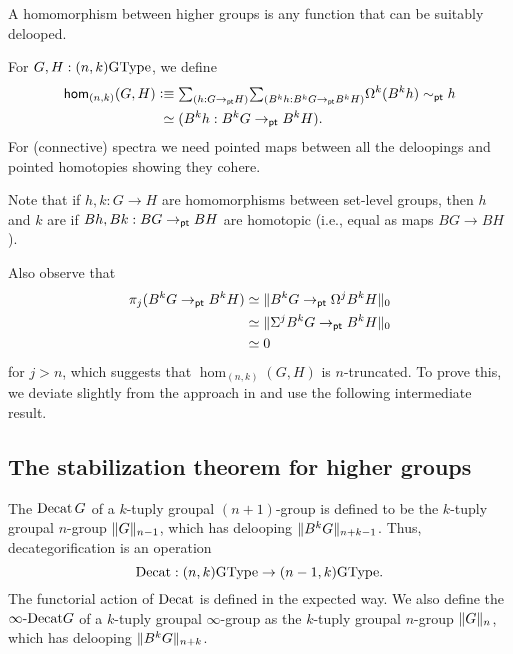 A homomorphism between higher groups is any
function that can be suitably delooped.

\begin{defn}
For $G,H : (n,k)\GType$, we define
\begin{align*}
\hom_{(n,k)}(G,H) & \defeq  
\sm{h: G \to_\pt H}{B^k h: B^kG \to_\pt B^kH} \loopspacesym^k(B^k h) \sim_\pt h \\
&\phantom{:}\eqvsym (B^k h: B^kG \to_\pt B^kH).
\end{align*}
For (connective) spectra we need
pointed maps between all the deloopings and pointed homotopies showing
they cohere.
\end{defn}

Note that if $h,k : G \to H$ are homomorphisms between set-level
groups, then $h$ and $k$ are  if $Bh, Bk : BG \to_\pt BH$ are
 homotopic (i.e., equal as maps $BG \to BH$).

Also observe that 
\begin{align*}
\pi_j(B^kG \to_\pt B^kH) & \eqvsym \trunc{0}{B^kG \to_\pt \loopspacesym^jB^kH} \\
& \eqvsym \trunc{0}{\Sigma^jB^kG \to_\pt B^kH} \\
& \eqvsym 0
\end{align*}
for $j>n$, which suggests that $\hom_{(n,k)}(G,H)$ is $n$-truncated. To prove this, we deviate slightly from the approach in \cite{BuchholtzDoornRijke} and use the following intermediate result.

\subsection{The stabilization theorem for higher groups}
\label{sec:stabilization}

\begin{defn}
The  $\Decat G$ of a $k$-tuply groupal $(n+1)$-group is defined to be the $k$-tuply groupal $n$-group $\trunc{n-1}{G}$, which has delooping $\trunc{n+k-1}{B^kG}$. Thus, decategorification is an operation
\begin{equation*}
\Decat : (n,k)\GType \to (n-1,k)\GType.
\end{equation*}
The functorial action of $\Decat$ is defined in the expected way. We also define the  $\iDecat G$ of a $k$-tuply groupal $\infty$-group as the $k$-tuply groupal $n$-group $\trunc{n}{G}$, which has delooping $\trunc{n+k}{B^k G}$. 
\end{defn}

